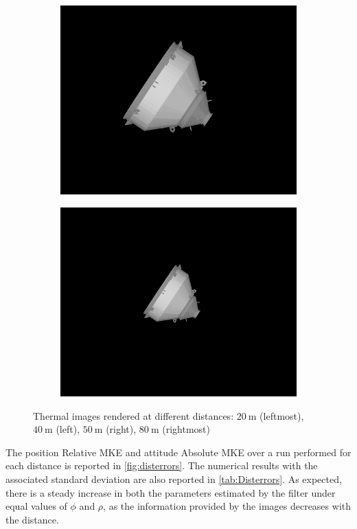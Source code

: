\begin{figure}[!h]
\begin{subfigure}{0.24\linewidth}
        \includegraphics[width=\linewidth]{Images/TIR50m.png}
    \end{subfigure}\hfill
    \begin{subfigure}{0.24\linewidth}
        \centering
        \includegraphics[width=\linewidth]{Images/TIR80m.png}
    \end{subfigure}
    \caption[Thermal images rendered at different distances]{Thermal images rendered at different distances: $\SI{20}{\meter}$ (leftmost), $\SI{40}{\meter}$ (left), $\SI{50}{\meter}$ (right), $\SI{80}{\meter}$ (rightmost)}
    \label{fig:TIRdistance}
\end{figure}
The position Relative MKE and attitude Absolute MKE over a run performed for each distance is reported in \cref{fig:disterrors}.  The numerical results with the associated standard deviation are also reported in \cref{tab:Disterrors}. As expected, there is a steady increase in both the parameters estimated by the filter under equal values of $\phi$ and $\rho$, as the information provided by the images decreases with the distance.\\

